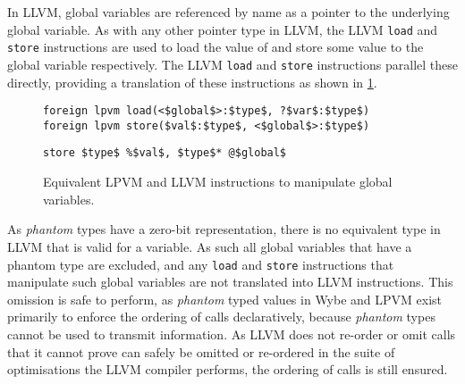 In LLVM, global variables are referenced by name as a pointer to the underlying global variable. As with any other pointer type in LLVM, the LLVM \texttt{load} and \texttt{store} instructions are used to load the value of and store some value to the global variable respectively. The LLVM \texttt{load} and \texttt{store} instructions parallel these directly, providing a translation of these instructions as shown in \cref{lst:lpvm-llvm-global-instructions}.

\begin{figure}[ht]
  \centering
  \begin{minipage}[t]{.56\textwidth}
    \begin{lstlisting}[mathescape]
foreign lpvm load(<$global$>:$type$, ?$var$:$type$)
foreign lpvm store($val$:$type$, <$global$>:$type$)
\end{lstlisting}
  \end{minipage}\hfill
  \begin{minipage}[t]{.4\textwidth}
    \begin{lstlisting}[numbers=none, mathescape]
%$var$ = load $type$, $type$* @$global$
store $type$ %$val$, $type$* @$global$
\end{lstlisting}
  \end{minipage}
  \caption{Equivalent LPVM and LLVM instructions to manipulate global variables.}
  \label{lst:lpvm-llvm-global-instructions}
\end{figure}

As \textit{phantom} types have a zero-bit representation, there is no equivalent type in LLVM that is valid for a variable. As such all global variables that have a phantom type are excluded, and any \texttt{load} and \texttt{store} instructions that manipulate such global variables are not translated into LLVM instructions. This omission is safe to perform, as \textit{phantom} typed values in Wybe and LPVM exist primarily to enforce the ordering of calls declaratively, because \textit{phantom} types cannot be used to transmit information. As LLVM does not re-order or omit calls that it cannot prove can safely be omitted or re-ordered in the suite of optimisations the LLVM compiler performs, the ordering of calls is still ensured.
